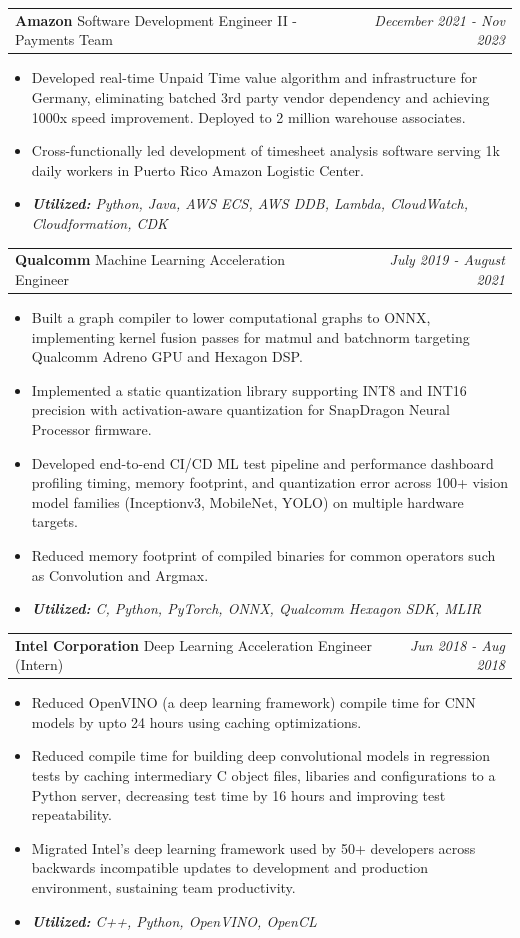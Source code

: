 \documentclass[letterpaper,10pt]{article}
\makeatletter
\newcommand{\resitem}[1]{\item #1 \vspace{0pt}}
\newcommand{\ressubheading}[4]{
\begin{tabular*}{7in}{l@{\extracolsep{\fill}}r}
		\textbf{#1} #2 & \textit{#4} \\
\end{tabular*}\vspace{0pt}}
\makeatother
\begin{document}
    \ressubheading{Amazon}{Software Development Engineer II - Payments Team}{}{December 2021 - Nov 2023}
	\begin{itemize} \vspace{-\topsep}
    \setlength{\parskip}{0pt}
    \setlength{\itemsep}{0pt}
    \resitem{Developed real-time Unpaid Time value algorithm and infrastructure for Germany, eliminating batched 3rd party vendor dependency and achieving 1000x speed improvement. Deployed to 2 million warehouse associates.}
    \resitem{Cross-functionally led development of timesheet analysis software serving 1k daily workers in Puerto Rico Amazon Logistic Center.}
    \resitem{\textsl{\textbf{Utilized:} Python, Java, AWS ECS, AWS DDB, Lambda, CloudWatch, Cloudformation, CDK}}
     \end{itemize}
\ressubheading{Qualcomm}{Machine Learning Acceleration Engineer}{}{July 2019 - August 2021}
	\begin{itemize} \vspace{-\topsep}
    \setlength{\parskip}{0pt}
    \setlength{\itemsep}{0pt}
    \resitem{Built a graph compiler to lower computational graphs to ONNX, implementing kernel fusion passes for matmul and batchnorm targeting Qualcomm Adreno GPU and Hexagon DSP.}
    \resitem{Implemented a static quantization library supporting INT8 and INT16 precision with activation-aware quantization for SnapDragon Neural Processor firmware.}
    \resitem{Developed end-to-end CI/CD ML test pipeline and performance dashboard profiling timing, memory footprint, and quantization error across 100+ vision model families (Inceptionv3, MobileNet, YOLO) on multiple hardware targets.}
    \resitem{Reduced memory footprint of compiled binaries for common operators such as Convolution and Argmax.}
    \resitem{\textsl{\textbf{Utilized:} C, Python, PyTorch, ONNX, Qualcomm Hexagon SDK, MLIR}}
    \end{itemize}
    

        \ressubheading{Intel Corporation}{Deep Learning Acceleration Engineer (Intern)}{}{Jun 2018 - Aug 2018}
	\begin{itemize} \vspace{-\topsep}
    \setlength{\parskip}{0pt}
    \setlength{\itemsep}{0pt plus 1pt}
        \resitem{Reduced OpenVINO (a deep learning framework) compile time for CNN models by upto 24 hours using caching optimizations.}
    \resitem{Reduced compile time for building deep convolutional models in regression tests by caching intermediary C object files, libaries and configurations to a Python server, decreasing test time by 16 hours and improving test repeatability.}
    \resitem{Migrated Intel's deep learning framework used by 50+ developers across backwards incompatible updates to development and production environment, sustaining team productivity.}
    \resitem{\textsl{\textbf{Utilized:}  C++, Python, OpenVINO, OpenCL }}
	\end{itemize}
\end{document}
